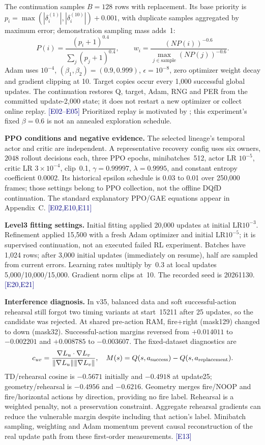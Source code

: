 \documentclass[11pt,a4paper]{article}
\newcommand{\ev}[1]{{\small\textcolor{navy}{[#1]}}}
\begin{document}
The continuation samples $B=128$ rows with replacement. Its base priority is $p_i=\max(|\delta_i^{(1)}|,|\delta_i^{(10)}|)+0.001$, with duplicate samples aggregated by maximum error; demonstration sampling mass adds~1:
\begin{equation}
 P(i)=\frac{(p_i+1)^{0.4}}{\sum_j(p_j+1)^{0.4}},\qquad
 w_i=\frac{(N P(i))^{-0.6}}{\max_{j\in\text{sample}}(NP(j))^{-0.6}}.\label{eq:per}
\end{equation}
Adam uses $10^{-4}$, $(\beta_1,\beta_2)=(0.9,0.999)$, $\epsilon=10^{-8}$, zero optimizer weight decay and gradient clipping at 10. Target copies occur every 1,000 successful global updates. The continuation restores Q, target, Adam, RNG and PER from the committed update-2,000 state; it does not restart a new optimizer or collect online replay. \ev{E02--E05} Prioritized replay is motivated by \cite{per}; this experiment's fixed $\beta=0.6$ is not an annealed exploration schedule.


\textbf{PPO conditions and negative evidence.} The selected lineage's temporal actor and critic are independent. A representative recovery config uses six owners, $2048$ rollout decisions each, three PPO epochs, minibatches~512, actor LR $10^{-5}$, critic LR $3\times10^{-4}$, clip~0.1, $\gamma=0.99997$, $\lambda=0.9995$, and constant entropy coefficient 0.0002. Its historical epsilon schedule is 0.03 to 0.01 over 250,000 frames; those settings belong to PPO collection, not the offline DQfD continuation. The standard explanatory PPO/GAE equations appear in Appendix~C. \ev{E02,E10,E11}


\textbf{Level3 fitting settings.} Initial fitting applied 20,000 updates at initial LR$10^{-3}$. Refinement applied 15,500 with a fresh Adam optimizer and initial LR$10^{-5}$; it is supervised continuation, not an executed failed RL experiment. Batches have 1,024 rows; after 3,000 initial updates (immediately on resume), half are sampled from current errors. Learning rates multiply by~0.3 at local updates 5,000/10,000/15,000. Gradient norm clips at~10. The recorded seed is 20261130. \ev{E20,E21}


\textbf{Interference diagnosis.} In v35, balanced data and soft successful-action rehearsal still forgot two timing variants at start~15211 after 25 updates, so the candidate was rejected. At shared pre-action RAM, fire+right (mask129) changed to down (mask32). Successful-action margins reversed from $+0.014011$ to $-0.002201$ and $+0.008785$ to $-0.003607$. The fixed-dataset diagnostics are
\begin{equation}\label{eq:interference}
 c_{uv}=\frac{\nabla L_u\cdot\nabla L_v}{\|\nabla L_u\|\|\nabla L_v\|},\quad
 M(s)=Q(s,a_{\rm success})-Q(s,a_{\rm replacement}).
\end{equation}
TD/rehearsal cosine is $-0.5671$ initially and $-0.4918$ at update25; geometry/rehearsal is $-0.4956$ and $-0.6216$. Geometry merges fire/NOOP and fire/horizontal actions by direction, providing no fire label. Rehearsal is a weighted penalty, not a preservation constraint. Aggregate rehearsal gradients can reduce the vulnerable margin despite including that action's label. Minibatch sampling, weighting and Adam momentum prevent causal reconstruction of the real update path from these first-order measurements. \ev{E13}
\end{document}
